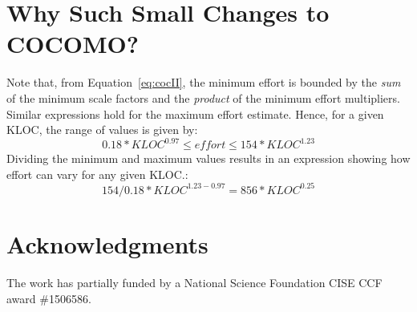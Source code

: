 \documentclass[final,twocolumn,5p]{elsarticle}
\newcommand{\eq}[1]{Equation~\ref{eq:#1}}
\begin{document}
\section{Why Such Small Changes to COCOMO?}

  
Note that, from \eq{cocII},
the minimum  
effort  is bounded by the  {\em sum} of the minimum scale factors
and the {\em product} of the minimum effort multipliers.
Similar expressions hold for the  maximum effort estimate. Hence,
for a given KLOC, the range of values is given by:
\[
0.18*\mathit{KLOC}^{0.97}  \le \mathit{effort} \le 154*\mathit{KLOC}^{1.23}\]
Dividing the minimum and maximum values results in an  expression showing
how    effort can vary for any given KLOC.: 
\begin{equation}\label{eq:ration}
154/0.18 *\mathit{KLOC}^{1.23 - 0.97} = 856*\mathit{KLOC}^{0.25}
\end{equation}


\section*{Acknowledgments}
The work has partially funded by a National Science Foundation CISE CCF award \#1506586.
 
\vspace*{0.5mm}
 
 
% 

  

   



 
    
\end{document}
